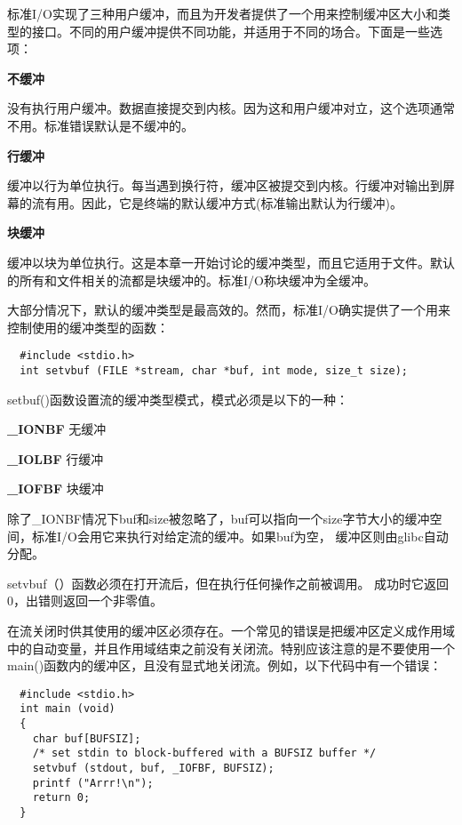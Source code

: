 标准I/O实现了三种用户缓冲，而且为开发者提供了一个用来控制缓冲区大小和类型的接口。不同的用户缓冲提供不同功能，并适用于不同的场合。下面是一些选项：
\begin{list}{}
\item \textbf{不缓冲}

没有执行用户缓冲。数据直接提交到内核。因为这和用户缓冲对立，这个选项通常不用。标准错误默认是不缓冲的。

\item \textbf{行缓冲}

缓冲以行为单位执行。每当遇到换行符，缓冲区被提交到内核。行缓冲对输出到屏幕的流有用。因此，它是终端的默认缓冲方式(标准输出默认为行缓冲)。

\item \textbf{块缓冲}

缓冲以块为单位执行。这是本章一开始讨论的缓冲类型，而且它适用于文件。默认的所有和文件相关的流都是块缓冲的。标准I/O称块缓冲为全缓冲。
\end{list}



大部分情况下，默认的缓冲类型是最高效的。然而，标准I/O确实提供了一个用来控制使用的缓冲类型的函数：
\begin{lstlisting}
  #include <stdio.h>
  int setvbuf (FILE *stream, char *buf, int mode, size_t size);
\end{lstlisting}

setbuf()函数设置流的缓冲类型模式，模式必须是以下的一种：


\begin{eqlist*}
\item[\textbf{\_IONBF}] 无缓冲
\item[\textbf{\_IOLBF}] 行缓冲
\item[\textbf{\_IOFBF}] 块缓冲
\end{eqlist*}




除了\_IONBF情况下buf和size被忽略了，buf可以指向一个size字节大小的缓冲空间，标准I/O会用它来执行对给定流的缓冲。如果buf为空， 缓冲区则由glibc自动分配。

setvbuf（）函数必须在打开流后，但在执行任何操作之前被调用。 成功时它返回0，出错则返回一个非零值。

在流关闭时供其使用的缓冲区必须存在。一个常见的错误是把缓冲区定义成作用域中的自动变量，并且作用域结束之前没有关闭流。特别应该注意的是不要使用一个main()函数内的缓冲区，且没有显式地关闭流。例如，以下代码中有一个错误：
\begin{lstlisting}
  #include <stdio.h>
  int main (void)
  {
    char buf[BUFSIZ];
    /* set stdin to block-buffered with a BUFSIZ buffer */
    setvbuf (stdout, buf, _IOFBF, BUFSIZ);
    printf ("Arrr!\n");
    return 0;
  }
\end{lstlisting}


